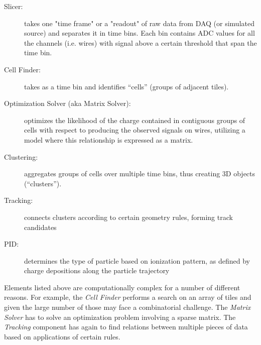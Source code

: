 \begin{description}
\item[Slicer:] takes one "time frame" or a "readout" of raw data from DAQ (or simulated source)
and separates it in time bins.  Each bin contains ADC values for all the channels
(i.e. wires) with signal above a certain threshold that span the time bin.
	
\item[Cell Finder:] takes as a time bin and identifies ``cells'' (groups of adjacent tiles).
	
\item[Optimization Solver (aka Matrix Solver):] optimizes the likelihood of the charge contained in contiguous groups of cells
with respect to producing the observed signals on wires, utilizing a model where this relationship is expressed as a matrix.
	
\item[Clustering:] aggregates groups of cells over multiple time bins, thus creating 3D objects (``clusters'').
	
\item[Tracking:] connects clusters according to certain geometry rules, forming track candidates
	
\item[PID:] determines the type of particle based on ionization pattern, as defined by
charge depositions along the particle trajectory
	
\end{description}

Elements listed above are computationally complex for a number of different reasons. For example,
the \textit{Cell Finder} performs a search on an array of tiles and given the large number
of those may face a combinatorial challenge. The \textit{Matrix Solver} has to solve an optimization
problem involving a sparse matrix. The \textit{Tracking} component has again to find relations
between multiple pieces of data based on applications of certain rules.



\newpage